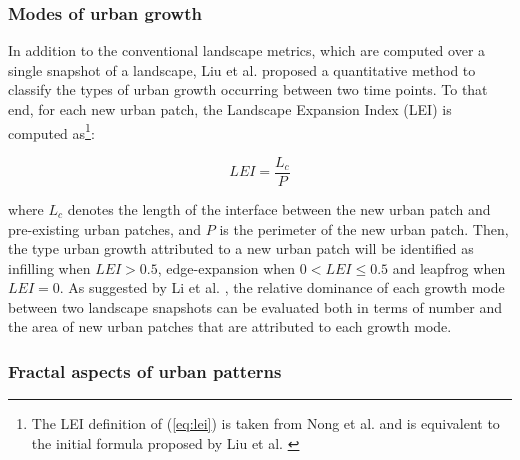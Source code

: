 \documentclass[10pt,letterpaper]{article}
\begin{document}
\subsubsection*{Modes of urban growth}

In addition to the conventional landscape metrics, which are computed over a single snapshot of a landscape, Liu et al. \cite{liu2010new} proposed a quantitative method to classify the types of urban growth occurring between two time points. 
To that end, for each new urban patch, the Landscape Expansion Index (LEI) is computed as\footnote{The LEI definition of (\ref{eq:lei}) is taken from Nong et al. \cite{nong2018quantifying} and is equivalent to the initial formula proposed by Liu et al. \cite{liu2010new}}:

\begin{equation}
  \label{eq:lei}
  LEI = \frac{L_c}{P}
\end{equation}

where $L_c$ denotes the length of the interface between the new urban patch and pre-existing urban patches, and $P$ is the perimeter of the new urban patch. Then, the type urban growth attributed to a new urban patch will be identified as infilling when $LEI > 0.5$, edge-expansion when $0 < LEI \leq 0.5$ and leapfrog when $LEI = 0$.
As suggested by Li et al. \cite{li2013quantifying}, the relative dominance of each growth mode between two landscape snapshots can be evaluated both in terms of number and the area of new urban patches that are attributed to each growth mode.

\subsubsection*{Fractal aspects of urban patterns}

\end{document}
